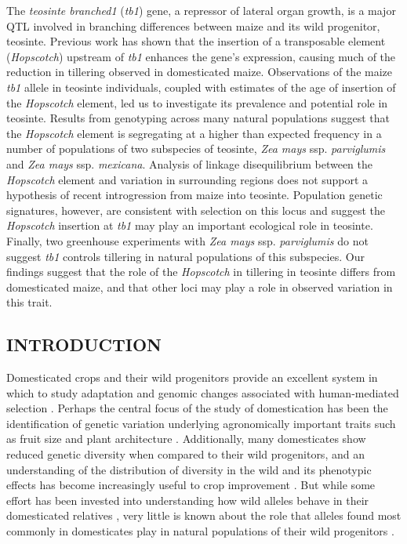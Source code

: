 \documentclass[11pt]{article}
\begin{document}
\begin{linenumbers}
\begin{flushleft}
The \emph{teosinte branched1} (\emph{tb1}) gene, a repressor of lateral organ growth, is a major QTL involved in branching differences between maize and its wild progenitor, teosinte. Previous work has shown that the insertion of a transposable element (\emph{Hopscotch}) upstream of \emph{tb1} enhances the gene's expression, causing much of the reduction in tillering observed in domesticated maize. Observations of the maize \emph{tb1} allele in teosinte individuals, coupled with estimates of the age of insertion of the \emph{Hopscotch} element, led us to investigate its prevalence and potential role in teosinte. Results from genotyping across many natural populations suggest that the \emph{Hopscotch} element is segregating at a higher than expected frequency in a number of populations of two subspecies of teosinte, \emph{Zea mays} ssp. \emph{parviglumis} and \emph{Zea mays} ssp. \emph{mexicana}. Analysis of linkage disequilibrium between the \emph{Hopscotch} element and variation in surrounding regions does not support a hypothesis of recent introgression from maize into teosinte.  Population genetic signatures, however, are consistent with selection on this locus and suggest the \emph{Hopscotch} insertion at \emph{tb1} may play an important ecological role in teosinte. Finally, two greenhouse experiments with \emph{Zea mays} ssp. \emph{parviglumis} do not suggest \emph{tb1} controls tillering in natural populations of this subspecies. Our findings suggest that the role of the \emph{Hopscotch} in tillering in teosinte differs from domesticated maize, and that other loci may play a role in observed variation in this trait.  

\clearpage

\begin{centering}
\section*{INTRODUCTION}
\end{centering}


Domesticated crops and their wild progenitors provide an excellent system in which to study adaptation and genomic changes associated with human-mediated selection \citep{Ross-Ibarra2007}. Perhaps the central focus of the study of domestication has been the identification of genetic variation underlying agronomically important traits such as fruit size and plant architecture \citep{OlsenGross2010}. Additionally, many domesticates show reduced genetic diversity when compared to their wild progenitors, and an understanding of the distribution of diversity in the wild and its phenotypic effects has become increasingly useful to crop improvement \citep{KovachMcCouch2008}. But while some effort has been invested into understanding how wild alleles behave in their domesticated relatives \citep[e.g.][]{Bai2007}, very little is known about the role that alleles found most commonly in domesticates play in natural populations of their wild progenitors \citep{Whitton1997}.


\end{flushleft}
\end{linenumbers}
\end{document}

